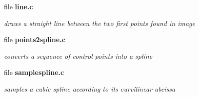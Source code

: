 \begin{CompactItemize}
\item 
file {\bf line.c}
\begin{CompactList}\small\item\em draws a straight line between the two first points found in image \item\end{CompactList}

\item 
file {\bf points2spline.c}
\begin{CompactList}\small\item\em converts a sequence of control points into a spline \item\end{CompactList}

\item 
file {\bf samplespline.c}
\begin{CompactList}\small\item\em samples a cubic spline according to its curvilinear abcissa \item\end{CompactList}

\end{CompactItemize}
